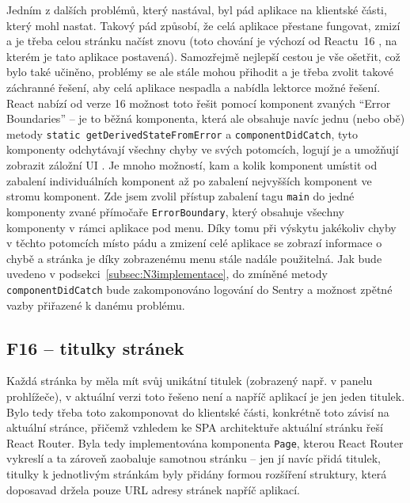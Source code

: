 Jedním z dalších problémů, který nastával, byl pád aplikace na klientské části, který mohl nastat. Takový pád způsobí, že celá aplikace přestane fungovat, zmizí a je třeba celou stránku načíst znovu (toto chování je výchozí od Reactu~16 \cite{react-errorboundaries}, na kterém je tato aplikace postavená). Samozřejmě nejlepší cestou je vše ošetřit, což bylo také učiněno, problémy se ale stále mohou přihodit a je třeba zvolit takové záchranné řešení, aby celá aplikace nespadla a nabídla lektorce možné řešení. React nabízí od verze 16 možnost toto řešit pomocí komponent zvaných \enquote{Error Boundaries} -- je to běžná komponenta, která ale obsahuje navíc jednu (nebo obě) metody \verb|static getDerivedStateFromError| a \verb|componentDidCatch|, tyto komponenty odchytávají všechny chyby ve svých potomcích, logují je a umožňují zobrazit záložní UI \cite{react-errorboundaries}. Je mnoho možností, kam a kolik komponent umístit od zabalení individuálních komponent až po zabalení nejvyšších komponent ve stromu komponent. Zde jsem zvolil přístup zabalení tagu \verb|main| do jedné komponenty zvané přímočaře \verb|ErrorBoundary|, který obsahuje všechny komponenty v rámci aplikace pod menu. Díky tomu při výskytu jakékoliv chyby v těchto potomcích místo pádu a zmizení celé aplikace se zobrazí informace o chybě a stránka je díky zobrazenému menu stále nadále použitelná. Jak bude uvedeno v podsekci~\ref{subsec:N3implementace}, do zmíněné metody \verb|componentDidCatch| bude zakomponováno logování do Sentry a možnost zpětné vazby přiřazené k danému problému.

\subsection{F16 -- titulky stránek}

Každá stránka by měla mít svůj unikátní titulek (zobrazený např. v panelu prohlížeče), v aktuální verzi toto řešeno není a napříč aplikací je jen jeden titulek. Bylo tedy třeba toto zakomponovat do klientské části, konkrétně toto závisí na aktuální stránce, přičemž vzhledem ke SPA architektuře aktuální stránku řeší React Router. Byla tedy implementována komponenta \verb|Page|, kterou React Router vykreslí a ta zároveň zaobaluje samotnou stránku -- jen jí navíc přidá titulek, titulky k jednotlivým stránkám byly přidány formou rozšíření struktury, která doposavad držela pouze URL adresy stránek napříč aplikací.

